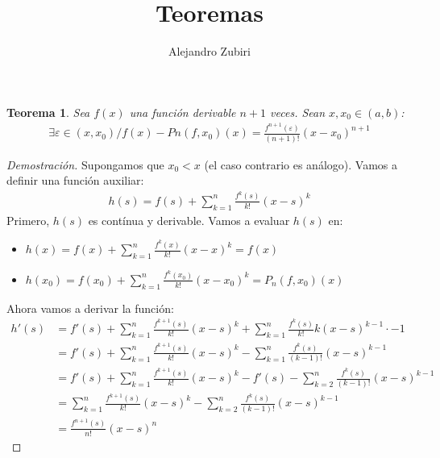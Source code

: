 \documentclass{article}
\title{Teoremas}
\author{Alejandro Zubiri}
\newtheorem{theorem}{Teorema}
\begin{document}
\maketitle
\tableofcontents
\pagebreak
\begin{theorem}
    Sea $f(x)$ una función derivable $n+1$ veces. Sean $x,x_{0} \in  (a,b)$:
    \begin{equation}
        \begin{split}
            \exists \varepsilon \in (x,x_{0}) / f(x)-Pn(f,x_{0})(x)= \frac{f^{n+1}(\varepsilon)}{(n+1)!}(x-x_{0})^{n+1}
        \end{split}
	\end{equation}

\end{theorem}
\begin{proof}[Demostración]
    Supongamos que $x_{0}<x$ (el caso contrario es análogo). Vamos a definir una función
    auxiliar:
    \begin{equation}
        \begin{split}
            h(s)= f(s) + \sum ^n_{k=1} \frac{f^k (s)}{k!}(x-s)^{k}
        \end{split}
    \end{equation}
    Primero, $h(s)$ es contínua y derivable. Vamos a evaluar $h(s)$ en:
    \begin{itemize}
        \item $h(x)=f(x) + \sum ^n_{k=1} \frac{f^k (x)}{k!}(x-x)^{k}=f(x)$
        \item $h(x_{0})=f(x_{0})+\sum ^n_{k=1} \frac{f^k (x_{0})}{k!}(x-x_{0})^{k}= P_{n}(f,x_{0})(x)$
    \end{itemize}
    Ahora vamos a derivar la función:
    \begin{equation}
        \begin{split}
            h'(s) &= f'(s)+ \sum _{k=1} ^n \frac{f^{k+1}(s)}{k!} (x-s)^{k} +\sum ^n_{k=1}
            \frac{f^k (s)}{k!}k(x-s)^{k-1}\cdot -1\\
            &= f'(s)+ \sum _{k=1} ^n \frac{f^{k+1}(s)}{k!} (x-s)^{k} - 
            \sum ^n_{k=1} \frac{f^k (s)}{(k-1)!}(x-s)^{k-1}\\
            &= f'(s) + \sum _{k=1} ^n \frac{f^{k+1}(s)}{k!} (x-s)^{k} -
            f'(s ) -\sum ^n_{k=2} \frac{f^k (s)}{(k-1)!}(x-s)^{k-1}\\
            &= \sum _{k=1} ^n \frac{f^{k+1}(s)}{k!} (x-s)^{k}-\sum ^n_{k=2} \frac{f^k (s)}{(k-1)!}(x-s)^{k-1}\\
            &= \frac{f^{n+1}(s)}{n!}(x-s)^{n}

\end{split}
\end{equation}
\end{proof}
\end{document}
